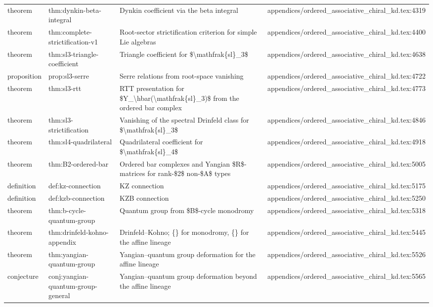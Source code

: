 \documentclass[11pt]{article}
\begin{document}
\begin{longtable}{L{0.10\textwidth}L{0.26\textwidth}L{0.42\textwidth}L{0.22\textwidth}}
theorem & thm:dynkin-beta-integral & Dynkin coefficient via the beta integral & appendices/ordered\_associative\_chiral\_kd.tex:4319\\
theorem & thm:complete-strictification-v1 & Root-sector strictification criterion for simple Lie algebras & appendices/ordered\_associative\_chiral\_kd.tex:4400\\
theorem & thm:sl3-triangle-coefficient & Triangle coefficient for \$\textbackslash{}mathfrak\{sl\}\_3\$ & appendices/ordered\_associative\_chiral\_kd.tex:4638\\
proposition & prop:sl3-serre & Serre relations from root-space vanishing & appendices/ordered\_associative\_chiral\_kd.tex:4722\\
theorem & thm:sl3-rtt & RTT presentation for \$Y\_\textbackslash{}hbar(\textbackslash{}mathfrak\{sl\}\_3)\$ from the ordered bar complex & appendices/ordered\_associative\_chiral\_kd.tex:4773\\
theorem & thm:sl3-strictification & Vanishing of the spectral Drinfeld class for \$\textbackslash{}mathfrak\{sl\}\_3\$ & appendices/ordered\_associative\_chiral\_kd.tex:4846\\
theorem & thm:sl4-quadrilateral & Quadrilateral coefficient for \$\textbackslash{}mathfrak\{sl\}\_4\$ & appendices/ordered\_associative\_chiral\_kd.tex:4918\\
theorem & thm:B2-ordered-bar & Ordered bar complexes and Yangian \$R\$-matrices for rank-\$2\$ non-\$A\$ types & appendices/ordered\_associative\_chiral\_kd.tex:5005\\
definition & def:kz-connection & KZ connection & appendices/ordered\_associative\_chiral\_kd.tex:5175\\
definition & def:kzb-connection & KZB connection & appendices/ordered\_associative\_chiral\_kd.tex:5250\\
theorem & thm:b-cycle-quantum-group & Quantum group from \$B\$-cycle monodromy & appendices/ordered\_associative\_chiral\_kd.tex:5318\\
theorem & thm:drinfeld-kohno-appendix & Drinfeld--Kohno; \{\} for monodromy, \{\} for the affine lineage & appendices/ordered\_associative\_chiral\_kd.tex:5445\\
theorem & thm:yangian-quantum-group & Yangian--quantum group deformation for the affine lineage & appendices/ordered\_associative\_chiral\_kd.tex:5526\\
conjecture & conj:yangian-quantum-group-general & Yangian--quantum group deformation beyond the affine lineage & appendices/ordered\_associative\_chiral\_kd.tex:5565\\

\end{longtable}
\end{document}
